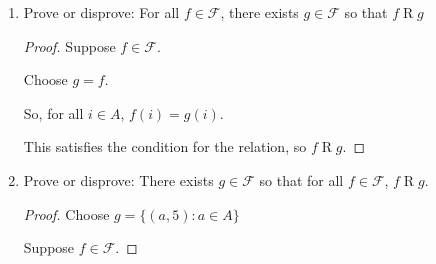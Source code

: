 \documentclass[]{article}
\begin{document}
\begin{enumerate}
\begin{enumerate}[label= (\alph*)]
\begin{enumerate}[label=(\roman*)]
\begin{proof}
                    So $f(i)=g(i)$ and $f=g$.

                    Therefore, $\mathrel{R}$ is antisymmetric.
                \end{proof}

                \item Transitive?

                $\mathrel{R}$ is transitive. So, for all $f,g,h\in\mathcal{F}$, 
                if $f\mathrel{R}g$ and $g\mathrel{R}h$, then $f\mathrel{R}h$.

                \begin{proof}
                    Suppose that $f,g,h\in\mathcal{F}$.

                    Further suppose that $f\mathrel{R}g$ and $g\mathrel{R}h$.

                    So for all $i\in A$, $f(i)\leq g(i)$ and $g(i)\leq h(i)$

                    \[f(i)\leq g(i)\leq h(i)\]
                    \[f(i)\leq h(i)\]

                    So $f\mathrel{R}h$.

                    Therefore, for all $f,g,h\in\mathcal{F}$, if $f\mathrel{R}g$ and $g\mathrel{R}h$, 
                    $f\mathrel{R}h$ and $\mathrel{R}$ is transitive.
                \end{proof}


            \end{enumerate}


        \item Prove or disprove: For all $f\in\mathcal{F}$, there exists $g\in \mathcal{F}$ so that $f\mathrel{R}g$
        \begin{proof}
            Suppose $f\in\mathcal{F}$. 

            Choose $g=f$.

            So, for all $i\in A$, $f(i)=g(i)$.

            This satisfies the condition for the relation, so $f\mathrel{R}g$.
        \end{proof}
        \newpage
        \item Prove or disprove: There exists $g\in\mathcal{F}$ so that for all $f\in\mathcal{F}$, $f\mathrel{R}g$.

        \begin{proof}
            Choose $g=\{(a,5):a\in A\}$
            
            Suppose $f\in\mathcal{F}$.


\end{proof}
\end{enumerate}
\end{enumerate}
\end{document}

